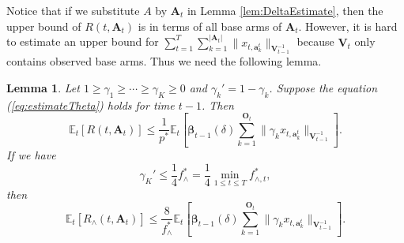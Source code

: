 \documentclass{article}
\newcommand{\bbeta}{\boldsymbol{\beta}}
\newcommand{\EE}{\mathbb{E}}
\newcommand{\bA}{\mathbf{A}}
\newcommand{\ba}{\mathbf{a}}
\newcommand{\bO}{\mathbf{O}}
\newcommand{\bV}{\mathbf{V}}
\newcommand{\abs}[1]{\left| #1 \right|}
\newcommand{\norm}[1]{\| #1 \|}
\newtheorem{lemma}[theorem]{Lemma}%
\begin{document}
Notice that if we substitute $A$ by $\bA_t$ in Lemma \ref{lem:DeltaEstimate}, then the upper bound of $R(t, \bA_t)$ is in terms of all base arms of $\bA_t$. 
However, it is hard to estimate an upper bound for $\sum_{t=1}^T \sum_{k=1}^{\abs{\bA_t}} \norm{ x_{t, \ba_k^t} }_{ \bV_{t-1}^{-1} }$ because $\bV_t$ only contains observed base arms. Thus we need the following lemma.

\begin{lemma} %
  \label{lem:DeltaEsimateWithP*}
  Let $1 \geq \gamma_1 \geq \cdots \geq \gamma_K \geq 0$ and $\gamma_k' = 1 - \gamma_k$.
  Suppose the equation (\ref{eq:estimateTheta}) holds for time $t-1$. Then
  $$
    \EE_t[R(t, \bA_t)] \leq \frac{1}{p^*} \EE_t \left[ \bbeta_{t-1}(\delta) \sum_{k=1}^{\bO_t}\norm{\gamma_k x_{t,\ba_k^t}}_{\bV_{t-1}^{-1}} \right].
  $$
  If we have
  $$
    \gamma_K' \le \frac{1}{4} f_{\wedge}^{\ast} = \frac{1}{4} \min_{1 \leq t \leq T} f_{\wedge, t}^{\ast},
  $$
  then
  $$
    \EE_t [R_{\wedge}(t, \bA_t) ] \leq \frac{8}{f_{\wedge}^{\ast}} \EE_t \left[ \bbeta_{t-1}(\delta)\sum_{k=1}^{\bO_t}\norm{\gamma_k x_{t,\ba_k^t}}_{\bV_{t-1}^{-1}} \right].
  $$
\end{lemma}
\end{document}
